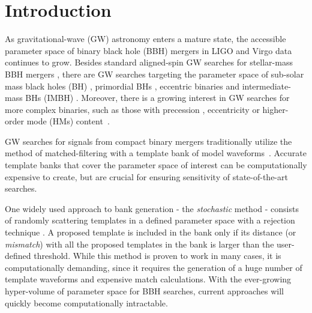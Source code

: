 \documentclass[twocolumn,showpacs,preprintnumbers,nofootinbib,prd,
superscriptaddress,10pt]{revtex4-2}
\begin{document}

\section{Introduction}

As gravitational-wave (GW) astronomy enters a mature state, the accessible parameter space of binary black hole (BBH) mergers in LIGO \cite{LIGOScientific:2014pky} and Virgo \cite{VIRGO:2014yos} data continues to grow. Besides standard aligned-spin GW searches for stellar-mass BBH mergers \cite{GWTC-1,GWTC-2,GWTC-2.1, GWTC-3}, there are GW searches targeting the parameter space of sub-solar mass black holes (BH) \cite{SSM_O2, SSM_O3a, PhysRevD.106.023024, Nitz:2021mzz}, primordial BHs \cite{PBH}, eccentric binaries \cite{PhysRevD.102.043005, PhysRevD.104.104016, Nitz:2019spj} and intermediate-mass BHs (IMBH) \cite{IMBH_O2, IMBH_O3, Chandra:2022ixv}. Moreover, there is a growing interest in GW searches for more complex binaries, such as those with precession \cite{PhysRevD.89.024010, PhysRevD.97.023004, PhysRevD.102.041302, Indik:2016qky, Harry:2016ijz}, eccentricity \cite{LIGOScientific:2019dag, Ramos-Buades:2020eju, Wang:2021qsu, Nitz:2021mzz} or higher-order mode (HMs) content~\cite{CalderonBustillo:2015lrt, PhysRevD.97.023004, Chandra_hom, 2021PhRvD.103b4042M}.

GW searches for signals from compact binary mergers traditionally utilize the method of matched-filtering with a template bank of model waveforms~\cite{Sathyaprakash:1991mt, Dhurandhar:1992mw, Owen:1998dk, Allen:2005fk, Babak:2006ty, Cokelaer:2007mv}. Accurate template banks that cover the parameter space of interest can be computationally expensive to create, but are crucial for ensuring sensitivity of state-of-the-art searches.

One widely used approach to bank generation - the {\it stochastic} method \cite{Harry:2009ea, PhysRevD.80.104014, Ajith:2012mn} - consists of randomly scattering templates in a defined parameter space with a rejection technique \cite{DalCanton:2017ala, Mukherjee:2018yra, Indik:2016qky, Lenon:2021zac}. A proposed template is included in the bank only if its distance (or {\it mismatch}) with all the proposed templates in the bank is larger than the user-defined threshold.
While this method is proven to work in many cases, it is computationally demanding, since it requires the generation of a huge number of template waveforms and expensive match calculations.
With the ever-growing hyper-volume of parameter space for BBH searches, current approaches will quickly become computationally intractable.
\end{document}
